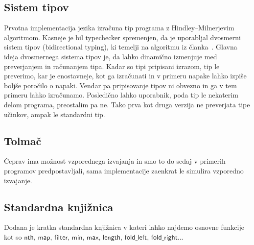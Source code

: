 \subsection{Sistem tipov}\label{sec:tipi}

Prvotna implementacija jezika \aeff{} izračuna tip programa z Hindley–Milnerjevim algoritmom. 
Kasneje je bil typechecker spremenjen, da je uporabljal dvosmerni sistem tipov (bidirectional typing), ki temelji na algoritmu iz članka~\cite{bidirectional}.
Glavna ideja dvosmernega sistema tipov je, da lahko dinamično izmenjuje med preverjanjem in računanjem tipa. Kadar so tipi pripisani izrazom, tip le preverimo, kar je enostavneje, kot ga izračunati in v primeru napake lahko izpiše boljše poročilo o napaki. Vendar pa pripisovanje tipov ni obvezno in ga v tem primeru lahko izračunamo. Posledično lahko uporabnik, poda tip le nekaterim delom programa, preostalim pa ne.
Tako prva kot druga verzija ne preverjata tipe učinkov, ampak le standardni tip.

\subsection{Tolmač}\label{sec:interpreter}

Čeprav ima \aeff{} možnost vzporednega izvajanja in smo to do sedaj v primerih programov predpostavljali, sama implementacije zaenkrat le simulira vzporedno izvajanje.


\subsection{Standardna knjižnica}\label{sec:std}

Dodana je kratka standardna knjižnica v kateri lahko najdemo osnovne funkcije kot so $\mathsf{nth}$, $\mathsf{map}$, $\mathsf{filter}$, $\mathsf{min}$, $\mathsf{max}$, $\mathsf{length}$, $\mathsf{fold\_left}$, $\mathsf{fold\_right}$...